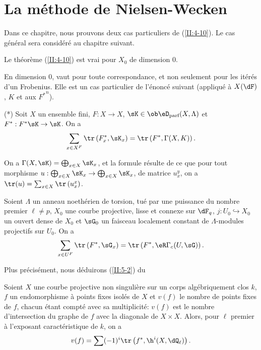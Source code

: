 \section{La méthode de Nielsen-Wecken}\label{II:5}

Dans ce chapitre, nous prouvons deux cas particuliers de (\ref{II:4-10}). Le 
cas général sera considéré au chapitre suivant. 





\begin{lemma_}\label{II:5-1}
Le théorème (\ref{II:4-10}) est vrai pour $X_0$ de dimension $0$. 
\end{lemma_}

En dimension $0$,  vaut pour toute 
correspondance, et non seulement pour les itérés d'un Frobenius. Elle est 
un cas particulier de l'énoncé suivant (appliqué à $X(\dF)$, $K$ et 
aux ${F^*}^n$). 

(*) Soit $X$ un ensemble fini, $F:X\to X$, $\sK\in\ob\eD_\text{parf}(X,\Lambda)$ 
et $F^*:F^* \sK\to \sK$. On a 
\[
  \sum_{x\in X^F} \tr\left(F_x^*,\sK_x\right) = \tr\left(F^*,\Gamma(X,K)\right) \text{.}
\]

On a $\Gamma(X,\sK)=\bigoplus_{x\in X} \sK_x$, et la formule résulte de ce que 
pour tout morphisme $u:\bigoplus_{x\in X} \sK_x\to \bigoplus_{x\in X} \sK_x$, de 
matrice $u_x^y$, on a $\tr(u)=\sum_{x\in X} \tr\left(u_x^x\right)$. 





\begin{lemma_}\label{II:5-2}
Soient $\Lambda$ un anneau noethérien de torsion, tué par une puissance du 
nombre premier $\ell\ne p$, $X_0$ une courbe projective, lisse et connexe sur 
$\dF_q$, $j:U_0\hookrightarrow X_0$ un ouvert dense de $X_0$ et $\sG_0$ un 
faisceau localement constant de $\Lambda$-modules projectifs sur $U_0$. On a 
\[
  \sum_{x\in U^F} \tr\left(F^*,\sG_x\right) = \tr\left(F^*,\eR\Gamma_c(U,\sG)\right) \text{.}
\]
\end{lemma_}

Plus précisément, nous déduirons (\ref{II:5-2}) du 





\begin{theorem_}\label{II:5-3}
Soient $X$ une courbe projective non singulière sur un corps algébriquement 
clos $k$, $f$ un endomorphisme à points fixes isolés de $X$ et $v(f)$ le 
nombre de points fixes de $f$, chacun étant compté avec sa multiplicité: 
$v(f)$ est le nombre d'intersection du graphe de $f$ avec la diagonale de 
$X\times X$. Alors, pour $\ell$ premier à l'exposant caractéristique de $k$, 
on a 
\[
  v(f) = \sum (-1)^i \tr\left(f^*,\h^i(X,\dQ_\ell)\right) \text{.}
\]
\end{theorem_}

